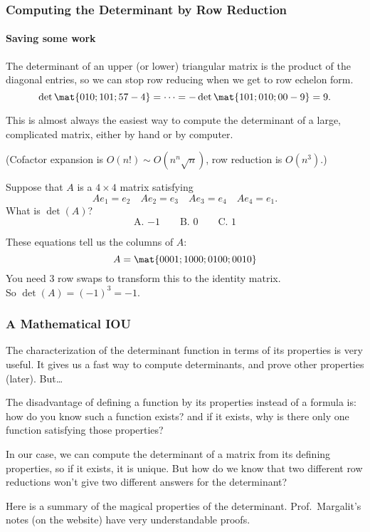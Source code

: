 \begin{frame}
\frametitle{Computing the Determinant by Row Reduction}
\framesubtitle{Saving some work}

The determinant of an upper (or lower)
triangular matrix is the product of the diagonal entries,
\pause
so we can stop row reducing when we get to row echelon form.
\pause\medskip
\[\det\mat{0 1 0; 1 0 1; 5 7 -4} = \cdots
= -\det\mat{1 0 1; 0 1 0; 0 0 -9} = 9.
\]

\vfill
\pause
\begin{bluebox}{.9\linewidth}
  This is almost always the easiest way to compute the determinant of a large,
  complicated matrix, either by hand or by computer.

  \pause\medskip
  (Cofactor expansion is $O(n!)\sim O(n^n\sqrt n)$, row reduction is $O(n^3)$.)
\end{bluebox}
\vfill

\end{frame}



\begin{pollframe}

\begin{bluebox}[Poll]{.8\linewidth}
    Suppose that $A$ is a $4\times 4$ matrix satisfying
    \[ Ae_1 = e_2 \quad Ae_2 = e_3 \quad Ae_3 = e_4 \quad Ae_4 = e_1. \]
    What is $\det(A)$?
    \[ \text{A. } {-1} \qquad \text{B. } 0 \qquad \text{C. } 1 \]
\end{bluebox}

\pause\bigskip
These equations tell us the columns of $A$:
\[ A = \mat{0 0 0 1; 1 0 0 0; 0 1 0 0; 0 0 1 0} \]
\pause
You need $3$ row swaps to transform this to the identity matrix.\\[1mm]
\pause
So $\det(A) = (-1)^3 = -1$.

\end{pollframe}



\begin{frame}
\frametitle{A Mathematical IOU}

The characterization of the determinant function in terms of its properties is
very useful.  It gives us a fast way to compute determinants, and prove other
properties (later).  But\ldots

\pause\bigskip
The disadvantage of defining a function by its properties instead of a formula
is:
\pause
how do you know such a function exists?
\pause
and if it exists, why is there only one function satisfying those properties?

\pause\bigskip
In our case, we can compute the determinant of a matrix from its defining
properties, so if it exists, it is unique.
\pause
But how do we know that two different row reductions won't give
two different answers for the determinant?

\pause\bigskip
Here is a summary of the magical properties of the determinant.  Prof.\
Margalit's notes (on the website) have very understandable proofs.

\end{frame}


